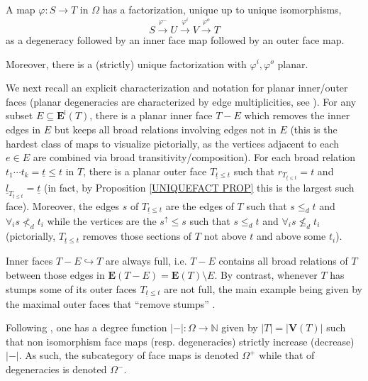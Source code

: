 \documentclass[a4paper,10pt
 ,draft
]{article}%
\begin{document}
\begin{proposition}\label{UNIQUEFACT PROP}
	A map $\varphi \colon S \to T$ in $\Omega$ has a factorization, unique up to unique isomorphisms,
\[
	S \xrightarrow{\varphi^{-}}
	U \xrightarrow{\varphi^{i}}
	V \xrightarrow{\varphi^{o}}
	T	
\]
as a degeneracy followed by an inner face map followed by an outer face map.

Moreover, there is a (strictly) unique factorization with $\varphi^i,\varphi^o$ planar. 
\end{proposition}

We next recall an explicit characterization and notation for planar inner/outer faces
(planar degeneracies are characterized by edge multiplicities, see \cite[Prop. 3.47(ii)]{BP17}).
For any subset $E \subseteq \boldsymbol{E}^{\mathsf{i}}(T)$, there is a planar inner face
$T-E$ which removes the inner edges in $E$ but keeps all broad relations involving edges not in $E$
(this is the hardest class of maps to visualize pictorially, as the vertices adjacent to each $e \in E$ are combined via broad transitivity/composition).
For each broad relation
$t_1 \cdots t_k = \underline{t} \leq t$ in $T$,
there is a planar outer face
$T_{\underline{t} \leq t}$
such that
$r_{T_{\underline{t} \leq t}} = t$ and
$\underline{l}_{T_{\underline{t} \leq t}} = \underline{t}$
(in fact, by Proposition \ref{UNIQUEFACT PROP} this is the largest such face).
Moreover, the edges $s$ of $T_{\underline{t} \leq t}$ are the edges of $T$ such that
$s \leq_d t$ and $\forall_{i} s \not <_d t_i$ while the vertices are the $s^{\uparrow} \leq s$ such that 
$s \leq_d t$ and $\forall_{i} s \not \leq_d t_i$ 
(pictorially, $T_{\underline{t} \leq t}$ removes those sections of $T$ not above $t$ and above some $t_i$).


\begin{remark}\label{INNFULL REM}
	Inner faces $T-E \hookrightarrow T$ are always full, i.e. $T-E$ contains all broad relations of $T$ between those edges in 
$\boldsymbol{E}(T-E) = \boldsymbol{E}(T) \setminus E$.
	By contrast, whenever $T$ has stumps some of its outer faces $T_{\underline{t} \leq t}$ are not full,
	the main example being given by the maximal outer faces
	that ``remove stumps'' \cite[Not. 5.41]{Per18}.
\end{remark}


\begin{remark}\label{DEGREE REM}
	Following \cite[Ex. 2.8]{BM11}, one has a degree function 
	$|-|\colon \Omega \to \mathbb{N}$ given by $|T|=|\boldsymbol{V}(T)|$
	such that non isomorphism face maps (resp. degeneracies) strictly increase (decrease) $|-|$.
	As such, the subcategory of face maps is denoted $\Omega^+$ while that of degeneracies is denoted $\Omega^-$.
\end{remark}
\end{document}
